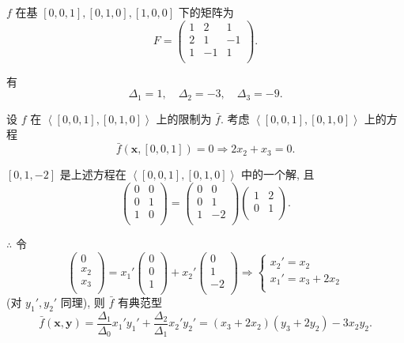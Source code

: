 \documentclass[color=black,device=normal,lang=cn,mode=geye]{elegantnote}
\begin{document}
\begin{solution}
    $f$ 在基 $[0,0,1],[0,1,0],[1,0,0]$ 下的矩阵为
    \[F=\begin{pmatrix}
        1 & 2  & 1  \\
        2 & 1  & -1 \\
        1 & -1 & 1  \\
    \end{pmatrix}.\]

    有
    \[\Delta_1=1,\quad\Delta_2=-3,\quad\Delta_3=-9.\]

    设 $f$ 在 $\left<[0,0,1],[0,1,0]\right>$ 上的限制为 $\bar{f}$. 考虑 $\left<[0,0,1],[0,1,0]\right>$ 上的方程
    \[\bar{f}(\boldsymbol{x},[0,0,1])=0\Rightarrow2x_2+x_3=0.\]

    $[0,1,-2]$ 是上述方程在 $\left<[0,0,1],[0,1,0]\right>$ 中的一个解, 且
    \[\begin{pmatrix}
        0 & 0 \\
        0 & 1 \\
        1 & 0 \\
    \end{pmatrix}=\begin{pmatrix}
        0 & 0 \\
        0 & 1 \\
        1 & -2 \\
    \end{pmatrix}\begin{pmatrix}
        1 & 2 \\
        0 & 1 \\
    \end{pmatrix}.\]

    $\therefore$ 令
    \[\begin{pmatrix}
        0 \\
        x_2 \\
        x_3 \\
    \end{pmatrix}=x_1'\begin{pmatrix}
        0 \\
        0 \\
        1 \\
    \end{pmatrix}+x_2'\begin{pmatrix}
        0 \\
        1 \\
        -2 \\
    \end{pmatrix}\Rightarrow\begin{cases}
        x_2'=x_2 \\
        x_1'=x_3+2x_2 \\
    \end{cases}\]
    (对 $y_1',y_2'$ 同理), 则 $\bar{f}$ 有典范型
    \[\bar{f}(\boldsymbol{x},\boldsymbol{y})=\dfrac{\Delta_1}{\Delta_0}x_1'y_1'+\dfrac{\Delta_2}{\Delta_1}x_2'y_2'=(x_3+2x_2)(y_3+2y_2)-3x_2y_2.\]


\end{solution}
\end{document}
